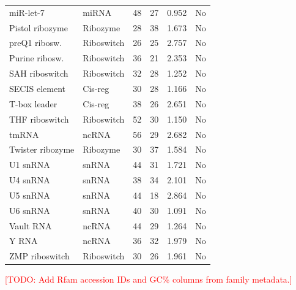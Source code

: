 \documentclass[11pt]{article}
\newcommand{\TODO}[1]{\textcolor{red}{[TODO: #1]}}
\begin{document}
\begin{table}[h]
\begin{tabular}{@{}llcccc@{}}
miR-let-7           & miRNA       & 48 & 27 & 0.952 & No \\
Pistol ribozyme     & Ribozyme    & 28 & 38 & 1.673 & No \\
preQ1 ribosw.       & Riboswitch  & 26 & 25 & 2.757 & No \\
Purine ribosw.      & Riboswitch  & 36 & 21 & 2.353 & No \\
SAH riboswitch      & Riboswitch  & 32 & 28 & 1.252 & No \\
SECIS element       & Cis-reg     & 30 & 28 & 1.166 & No \\
T-box leader        & Cis-reg     & 38 & 26 & 2.651 & No \\
THF riboswitch      & Riboswitch  & 52 & 30 & 1.150 & No \\
tmRNA               & ncRNA       & 56 & 29 & 2.682 & No \\
Twister ribozyme    & Ribozyme    & 30 & 37 & 1.584 & No \\
U1 snRNA            & snRNA       & 44 & 31 & 1.721 & No \\
U4 snRNA            & snRNA       & 38 & 34 & 2.101 & No \\
U5 snRNA            & snRNA       & 44 & 18 & 2.864 & No \\
U6 snRNA            & snRNA       & 40 & 30 & 1.091 & No \\
Vault RNA           & ncRNA       & 44 & 29 & 1.264 & No \\
Y RNA               & ncRNA       & 36 & 32 & 1.979 & No \\
ZMP riboswitch      & Riboswitch  & 30 & 26 & 1.961 & No \\
\bottomrule
\end{tabular}
\end{table}

\TODO{Add Rfam accession IDs and GC\% columns from family metadata.}
\end{document}
